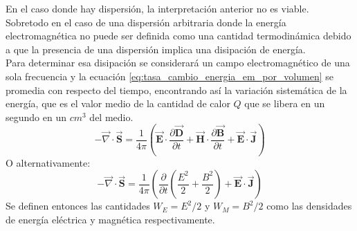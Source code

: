 En el caso donde hay dispersión, la interpretación anterior no es viable. Sobretodo en el caso de una dispersión arbitraria donde la energía electromagnética no puede ser definida como una cantidad termodinámica debido a que la presencia de una dispersión implica una disipación de energía.\\
Para determinar esa disipación se considerará un campo electromagnético de una sola frecuencia y la ecuación \ref{eq:tasa_cambio_energia_em_por_volumen} se promedia con respecto del tiempo, encontrando así la variación sistemática de la energía, que es el valor medio de la cantidad de calor $Q$ que se libera en un segundo en un $cm^3$ del medio.
\begin{equation}
-\overrightarrow{\nabla} \cdot \overrightarrow{\textbf{S}}= \frac{1}{4 \pi}\left(\overrightarrow{\textbf{E}}\cdot \frac{\partial \overrightarrow{\textbf{D}}}{\partial t} + \overrightarrow{\textbf{H}}\cdot \frac{\partial \overrightarrow{\textbf{B}}}{\partial t} + \overrightarrow{\textbf{E}}\cdot \overrightarrow{\textbf{J}} \right)
\end{equation}
O alternativamente:
\begin{equation}
-\overrightarrow{\nabla} \cdot \overrightarrow{\textbf{S}}= \frac{1}{4 \pi}\left(\frac{\partial}{\partial t}\left(\frac{E^2}{2} + \frac{B^2}{2}\right) + \overrightarrow{\textbf{E}}\cdot \overrightarrow{\textbf{J}} \right)
\end{equation}
Se definen entonces las cantidades $W_E=E^2/2$ y $W_M=B^2/2$ como las densidades de energía eléctrica y magnética respectivamente.